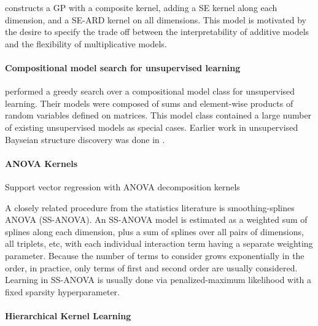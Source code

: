 \documentclass[twoside]{article}
\begin{document}
\cite{plate1999accuracy} constructs a GP with a composite kernel, adding a SE kernel along each dimension, and a SE-ARD kernel on all dimensions.  This model is motivated by the desire to specify the trade off between the interpretability of additive models and the flexibility of multiplicative models.

\paragraph{Compositional model search for unsupervised learning} \cite{grosse2012exploiting} performed a greedy search over a compositional model class for unsupervised learning.  Their models were composed of sums and element-wise products of random variables defined on matrices.  This model class contained a large number of existing unsupervised models as special cases.  Earlier work in unsupervised Bayseian structure discovery was done in \cite{kemp2008discovery}.

\paragraph{ANOVA Kernels}

Support vector regression with ANOVA decomposition kernels \cite{stitson1999support}

A closely related procedure from the statistics literature is smoothing-splines ANOVA (SS-ANOVA)\cite{wahba1990spline, gu2002smoothing}.
An SS-ANOVA model is estimated as a weighted sum of splines along each dimension, plus a sum of splines over all pairs of dimensions, all triplets, etc, with each individual interaction term having a separate weighting parameter.
Because the number of terms to consider grows exponentially in the order, in practice, only terms of first and second order are usually considered.
Learning in SS-ANOVA is usually done via penalized-maximum likelihood with a fixed sparsity hyperparameter.

\paragraph{Hierarchical Kernel Learning}
\end{document}
